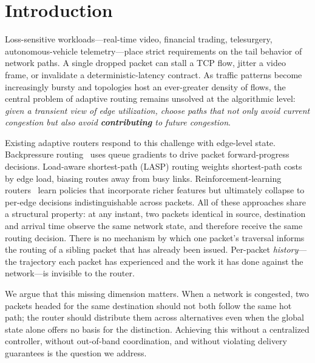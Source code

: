 
\section{Introduction}
\label{sec:introduction}

Loss-sensitive workloads---real-time video, financial trading,
telesurgery, autonomous-vehicle telemetry---place strict requirements
on the tail behavior of network paths. A single dropped packet
can stall a TCP flow, jitter a video frame, or invalidate a
deterministic-latency contract. As traffic patterns become
increasingly bursty and topologies host an ever-greater density of
flows, the central problem of adaptive routing remains
unsolved at the algorithmic level: \emph{given a transient view of
edge utilization, choose paths that not only avoid current
congestion but also avoid \textbf{contributing} to future congestion}.

Existing adaptive routers respond to this challenge with edge-level
state. Backpressure routing~\cite{tassiulas1992stability,
ji2013delay} uses queue gradients to drive packet
forward-progress decisions. Load-aware shortest-path (LASP) routing weights
shortest-path costs by edge load, biasing routes away from
busy links. Reinforcement-learning routers~\cite{boyan1994packet,
valadarsky2017learning} learn policies that incorporate richer
features but ultimately collapse to per-edge decisions
indistinguishable across packets. All of these approaches share a
structural property: at any instant, two packets identical in
source, destination and arrival time observe the same network
state, and therefore receive the same routing decision. There is no
mechanism by which one packet's traversal informs the routing of a
sibling packet that has already been issued. Per-packet
\emph{history}---the trajectory each packet has experienced and
the work it has done against the network---is invisible to the
router.

We argue that this missing dimension matters. When a network is
congested, two packets headed for the same destination should not
both follow the same hot path; the router should distribute them
across alternatives even when the global state alone offers no
basis for the distinction. Achieving this without a centralized
controller, without out-of-band coordination, and without violating
delivery guarantees is the question we address.

